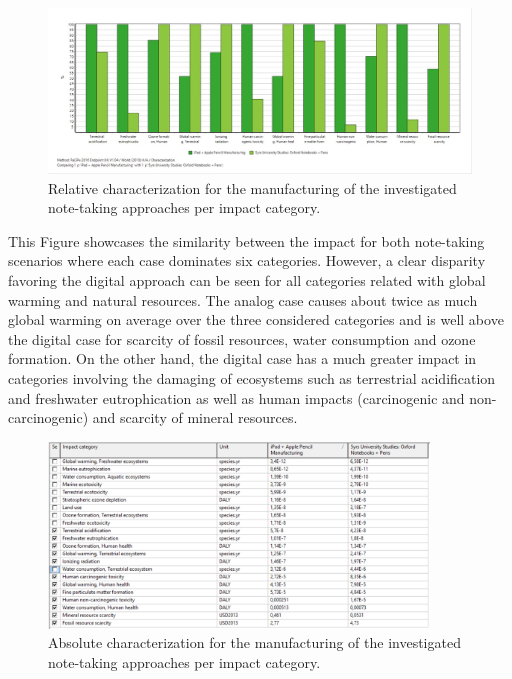 \begin{figure}[H]
    \centering
    \includegraphics[width=\textwidth]{images/Manufacturing/Characterization_Manufacturing.JPG}
    \caption{Relative characterization for the manufacturing of the investigated note-taking approaches per impact category.}\label{fig:characterization_manufacturing}
\end{figure}

This Figure showcases the similarity between the impact for both note-taking scenarios where each case dominates six categories. However, a clear disparity favoring the digital approach can be seen for all categories related with global warming and natural resources. The analog case causes about twice as much global warming on average over the three considered categories and is well above the digital case for scarcity of fossil resources, water consumption and ozone formation. On the other hand, the digital case has a much greater impact in categories involving the damaging of ecosystems such as terrestrial acidification and freshwater eutrophication as well as human impacts (carcinogenic and non-carcinogenic) and scarcity of mineral resources.

\begin{figure}[H]
    \centering
    \includegraphics[width=0.9\textwidth]{images/Manufacturing/Characterization_Table_Manufacturing.PNG}
    \caption{Absolute characterization for the manufacturing of the investigated note-taking approaches per impact category.}\label{fig:characterization_table_manufacturing}
\end{figure}

